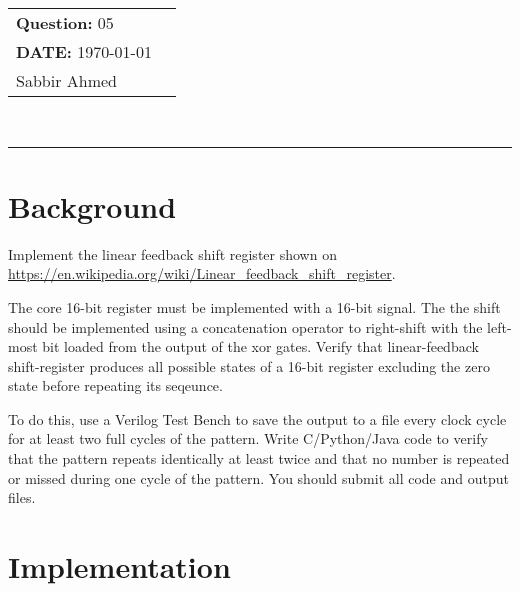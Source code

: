 \documentclass[paper=usletter, fontsize=12pt]{article}
\newcommand{\documentinfo}[3]{
    \begin{centering}
        \parbox{2in}{
        \begin{spacing}{1}
            \begin{flushleft}
                \begin{tabular}{l l}
                    #1 \\
                    #2 \\
                    #3 \\
                \end{tabular}\\
                \rule{\textwidth}{1pt}
            \end{flushleft}
        \end{spacing}
        }
    \end{centering}
}
\begin{document}
    \documentinfo{\textbf{Question:} 05}{\textbf{DATE:} \today}{Sabbir Ahmed}
    \vspace{-0.1in}

    \section{Background}
    Implement the linear feedback shift register shown on \url{https://en.wikipedia.org/wiki/Linear_feedback_shift_register}.

    The core 16-bit register must be implemented with a 16-bit signal. The the shift should be implemented using a concatenation operator to right-shift with the left-most bit loaded from the output of the xor gates. Verify that linear-feedback shift-register produces all possible states of a 16-bit register excluding the zero state before repeating its seqeunce.

    To do this, use a Verilog Test Bench to save the output to a file every clock cycle for at least two full cycles of the pattern. Write C/Python/Java code to verify that the pattern repeats identically at least twice and that no number is repeated or missed during one cycle of the pattern. You should submit all code and output files.

    \section{Implementation}
\end{document}
